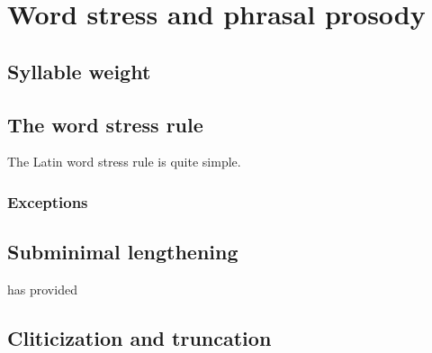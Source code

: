 \chapter{Word stress and phrasal prosody}
\label{wordphraseprosody}

\section{Syllable weight}

\citet{Ryan2011}

\section{The word stress rule}

The Latin word stress rule is quite simple.

\subsection{Exceptions}

\section{Subminimal lengthening}

\citet{Mester1994} has provided

\section{Cliticization and truncation}
